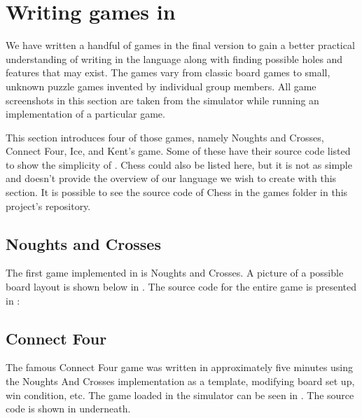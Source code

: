 \section{Writing games in \productname{}}
\label{sec:writinggames}
We have written a handful of games in the final version \productname{}
to gain a better practical understanding of writing in the language
along with finding possible holes and features that may exist. The games
vary from classic board games to small, unknown puzzle games invented by
individual group members. All game screenshots in this section are taken
from the simulator while running an implementation of a particular game.

This section introduces four of those games, namely Noughts and Crosses,
Connect Four, Ice, and Kent's game. Some of these have their source code
listed to show the simplicity of \productname{}. Chess could also be
listed here, but it is not as simple and doesn't provide the overview
of our language we wish to create with this section. It is possible
to see the source code of Chess in the games folder in this project's
repository.

\subsection{Noughts and Crosses}
The first game implemented in \productname{} is Noughts and
Crosses. A picture of a possible board layout is shown below in
. The source code for the entire game is presented 
in :



\subsection{Connect Four}
The famous Connect Four game was written in approximately five minutes
using the Noughts And Crosses implementation as a template, modifying
board set up, win condition, etc. The game loaded in the simulator can
be seen in . The source code is shown in
 underneath.



